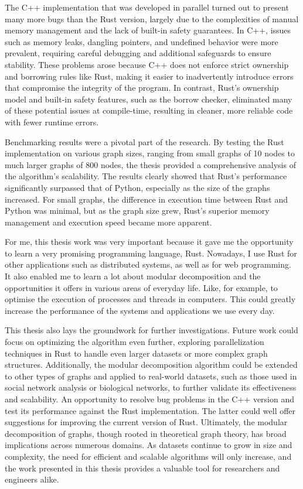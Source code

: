 The C++ implementation that was developed in parallel turned out to present many more bugs than the Rust version, largely due to the complexities of manual memory management and the lack of built-in safety guarantees.
In C++, issues such as memory leaks, dangling pointers, and undefined behavior were more prevalent, requiring careful debugging and additional safeguards to ensure stability.
These problems arose because C++ does not enforce strict ownership and borrowing rules like Rust, making it easier to inadvertently introduce errors that compromise the integrity of the program.
In contrast, Rust’s ownership model and built-in safety features, such as the borrow checker, eliminated many of these potential issues at compile-time, resulting in cleaner, more reliable code with fewer runtime errors.

Benchmarking results were a pivotal part of the research.
By testing the Rust implementation on various graph sizes, ranging from small graphs of 10 nodes to much larger graphs of 800 nodes, the thesis provided a comprehensive analysis of the algorithm’s scalability.
The results clearly showed that Rust’s performance significantly surpassed that of Python, especially as the size of the graphs increased.
For small graphs, the difference in execution time between Rust and Python was minimal, but as the graph size grew, Rust’s superior memory management and execution speed became more apparent.

For me, this thesis work was very important because it gave me the opportunity to learn a very promising programming language, Rust.
Nowadays, I use Rust for other applications such as distributed systems, as well as for web programming.
It also enabled me to learn a lot about modular decomposition and the opportunities it offers in various areas of everyday life.
Like, for example, to optimise the execution of processes and threads in computers.
This could greatly increase the performance of the systems and applications we use every day.

This thesis also lays the groundwork for further investigations.
Future work could focus on optimizing the algorithm even further,
exploring parallelization techniques in Rust to handle even larger datasets or more complex graph structures.
Additionally, the modular decomposition algorithm could be extended to other types of graphs and applied to real-world datasets,
such as those used in social network analysis or biological networks, to further validate its effectiveness and scalability.
An opportunity to resolve bug problems in the C++ version and test its performance against the Rust implementation.
The latter could well offer suggestions for improving the current version of Rust.
Ultimately, the modular decomposition of graphs, though rooted in theoretical graph theory, has broad implications across numerous domains.
As datasets continue to grow in size and complexity, the need for efficient and scalable algorithms will only increase,
and the work presented in this thesis provides a valuable tool for researchers and engineers alike.

